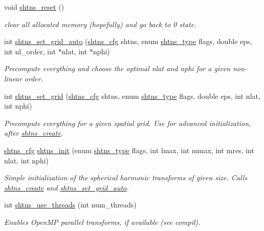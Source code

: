 \begin{DoxyCompactItemize}
void \hyperlink{group__init_ga65e8f69a3d2e908f67b6fda32ecda4b4}{shtns\+\_\+reset} ()
\begin{DoxyCompactList}\small\item\em clear all allocated memory (hopefully) and go back to 0 state. \end{DoxyCompactList}\item 
int \hyperlink{group__init_gaef4a2d2c275443f0d4cf877c2e5feaad}{shtns\+\_\+set\+\_\+grid\+\_\+auto} (\hyperlink{shtns_8h_ab7bd78e5cbeb4ed18782d018195fde00}{shtns\+\_\+cfg} shtns, enum \hyperlink{shtns_8h_abdccbb8fbce176dbe189d494c94f0f7b}{shtns\+\_\+type} flags, double eps, int nl\+\_\+order, int $\ast$nlat, int $\ast$nphi)
\begin{DoxyCompactList}\small\item\em Precompute everything and choose the optimal nlat and nphi for a given non-\/linear order. \end{DoxyCompactList}\item 
int \hyperlink{group__init_ga504eedd43b90d435fc55f7e22e18c44e}{shtns\+\_\+set\+\_\+grid} (\hyperlink{shtns_8h_ab7bd78e5cbeb4ed18782d018195fde00}{shtns\+\_\+cfg} shtns, enum \hyperlink{shtns_8h_abdccbb8fbce176dbe189d494c94f0f7b}{shtns\+\_\+type} flags, double eps, int nlat, int nphi)
\begin{DoxyCompactList}\small\item\em Precompute everything for a given spatial grid. Use for advanced initialization, after \hyperlink{group__init_ga54b088013246e361b3c7387ac17bf9c1}{shtns\+\_\+create}. \end{DoxyCompactList}\item 
\hyperlink{shtns_8h_ab7bd78e5cbeb4ed18782d018195fde00}{shtns\+\_\+cfg} \hyperlink{group__init_ga8199210424d47f2b0bce9bd7d0f9957d}{shtns\+\_\+init} (enum \hyperlink{shtns_8h_abdccbb8fbce176dbe189d494c94f0f7b}{shtns\+\_\+type} flags, int lmax, int mmax, int mres, int nlat, int nphi)
\begin{DoxyCompactList}\small\item\em Simple initialization of the spherical harmonic transforms of given size. Calls \hyperlink{group__init_ga54b088013246e361b3c7387ac17bf9c1}{shtns\+\_\+create} and \hyperlink{group__init_gaef4a2d2c275443f0d4cf877c2e5feaad}{shtns\+\_\+set\+\_\+grid\+\_\+auto}. \end{DoxyCompactList}\item 
int \hyperlink{group__init_ga4cc3eef247a78a1d910794e88f742e3a}{shtns\+\_\+use\+\_\+threads} (int num\+\_\+threads)
\begin{DoxyCompactList}\small\item\em Enables Open\+M\+P parallel transforms, if available (see compil). \end{DoxyCompactList}\item 

\end{DoxyCompactItemize}
